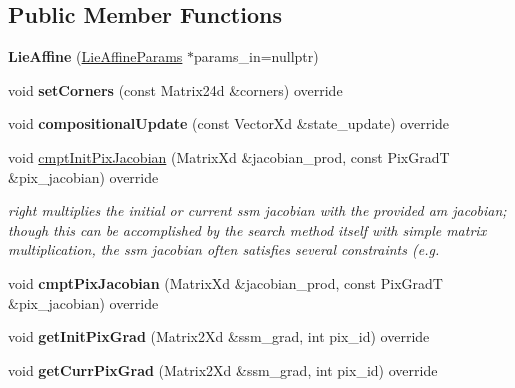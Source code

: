 \subsection*{Public Member Functions}
\begin{DoxyCompactItemize}
\item 
\hypertarget{classLieAffine_a17705db354ead43d4339e209f40139b5}{{\bfseries Lie\-Affine} (\hyperlink{structLieAffineParams}{Lie\-Affine\-Params} $\ast$params\-\_\-in=nullptr)}\label{classLieAffine_a17705db354ead43d4339e209f40139b5}

\item 
\hypertarget{classLieAffine_a4ca9553e02449785e853d6922c8c5513}{void {\bfseries set\-Corners} (const Matrix24d \&corners) override}\label{classLieAffine_a4ca9553e02449785e853d6922c8c5513}

\item 
\hypertarget{classLieAffine_ad5a417d95c28c8d67fe076fdc63a8e01}{void {\bfseries compositional\-Update} (const Vector\-Xd \&state\-\_\-update) override}\label{classLieAffine_ad5a417d95c28c8d67fe076fdc63a8e01}

\item 
void \hyperlink{classLieAffine_a25b82bb4020629dfaa792b71e6b74567}{cmpt\-Init\-Pix\-Jacobian} (Matrix\-Xd \&jacobian\-\_\-prod, const Pix\-Grad\-T \&pix\-\_\-jacobian) override
\begin{DoxyCompactList}\small\item\em right multiplies the initial or current ssm jacobian with the provided am jacobian; though this can be accomplished by the search method itself with simple matrix multiplication, the ssm jacobian often satisfies several constraints (e.\-g. \end{DoxyCompactList}\item 
\hypertarget{classLieAffine_af01629a5e34f114904f866d146ff0105}{void {\bfseries cmpt\-Pix\-Jacobian} (Matrix\-Xd \&jacobian\-\_\-prod, const Pix\-Grad\-T \&pix\-\_\-jacobian) override}\label{classLieAffine_af01629a5e34f114904f866d146ff0105}

\item 
\hypertarget{classLieAffine_a20dfcf2476ee928bea5ed20e1dfe4059}{void {\bfseries get\-Init\-Pix\-Grad} (Matrix2\-Xd \&ssm\-\_\-grad, int pix\-\_\-id) override}\label{classLieAffine_a20dfcf2476ee928bea5ed20e1dfe4059}

\item 
\hypertarget{classLieAffine_abfbee75881f854408717116edaca223a}{void {\bfseries get\-Curr\-Pix\-Grad} (Matrix2\-Xd \&ssm\-\_\-grad, int pix\-\_\-id) override}\label{classLieAffine_abfbee75881f854408717116edaca223a}


\end{DoxyCompactItemize}
